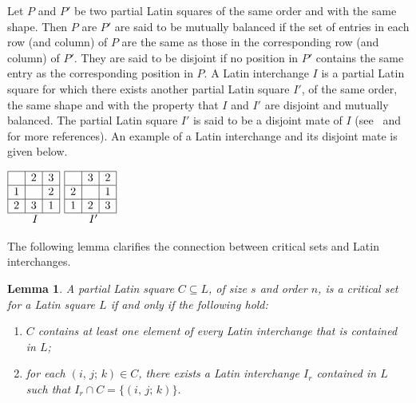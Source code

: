 \documentclass[12pt]{article}
\newtheorem{lemma}{Lemma}
\def\arraystretch{1.0}                 %
\begin{document}
 Let $P$ and $P'$ be two
partial Latin squares of the same order and with the same shape.
Then $P$ are $P'$ are said to be {\sf mutually balanced} if the set of
entries in each row (and column) of $P$ are the same as those in the
corresponding row (and column) of $P'$. They are said to be {\sf disjoint}
 if no position in $P'$ contains the same entry as the corresponding position
in $P$.
A {\sf Latin interchange} $I$ is a partial Latin square for
which there exists another partial Latin square $I'$, of the same order,
the same shape and with the property that $I$ and $I'$ are disjoint and
mutually balanced. The partial Latin square $I'$ is said to be a {\sf
disjoint mate} of $I$ (see~{\bf\cite{dha}} and~{\bf\cite{k2}}
for more references).
An example of a Latin interchange and its disjoint mate is given below.
%
\def\arraystretch{1.0}                 %
\begin{center}
$
\begin{array}{|c|c|c|}
\hline
&2& 3  \\ \hline
1&%
& 2  \\ \hline
2&3& 1      \\ \hline
\multicolumn{3}{@{\hspace{2pt}}l@{\hspace{2pt}}@{\hspace{0pt}}}{
\hspace*{0.70cm}
I
}
\end{array}
$
\qquad
$
\begin{array}{|c|c|c|}
\hline
&3& 2  \\ \hline
2&
& 1  \\ \hline
1&2& 3      \\ \hline
\multicolumn{3}{@{\hspace{2pt}}l@{\hspace{2pt}}@{\hspace{0pt}}}{
\hspace*{0.70cm}
I'
}
\end{array}
$
\end{center}
%
The following lemma clarifies the connection between critical sets and Latin
interchanges.
%
\begin{lemma}
A partial Latin square $C\subseteq L$, of size $s$ and
order $n$, is a critical set for a Latin square $L$ if and only if the
following hold:
%
\begin{enumerate}
\item[$(1)$]
$C$ contains at least one element of every Latin interchange
that is contained in $L$;
\item[$(2)$]
for each $(i,\, j;\, k)\in C$, there exists a Latin interchange
$I_r$ contained in $L$ such that $I_r\cap C = \{(i,\, j;\, k)\}.$
\end{enumerate}
\end{lemma}
\end{document}
